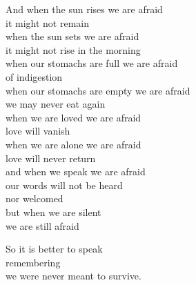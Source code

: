 \documentclass[12pt, openany, letterpaper]{memoir}
\begin{document}
\begin{minipage}[t]{0.45\linewidth}	
	And when the sun rises we are afraid\\
	it might not remain\\
	when the sun sets we are afraid\\
	it might not rise in the morning\\
	when our stomachs are full we are afraid\\
	of indigestion\\
	when our stomachs are empty we are afraid\\
	we may never eat again\\
	when we are loved we are afraid\\
	love will vanish\\
	when we are alone we are afraid\\
	love will never return\\
	and when we speak we are afraid\\
	our words will not be heard\\
	nor welcomed\\
	but when we are silent\\
	we are still afraid
	
	So it is better to speak\\
	remembering\\
	we were never meant to survive.
\end{minipage}
\end{document}
